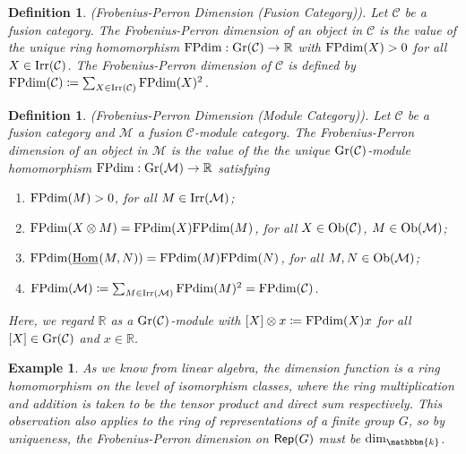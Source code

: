 \documentclass[12pt, reqno]{amsart}
\numberwithin{equation}{section}
\theoremstyle{plainspace}
\theoremstyle{definitionspace}
\newtheorem{definition}[theorem]{Definition}
\newtheorem{example}[theorem]{Example}
\theoremstyle{remarkspace}
\newcommand{\mathcat}[1]{\mathcal{#1}}
\newcommand{\Ob}{\textup{Ob}}
\newcommand{\IntHom}[2][]{
	\ifthenelse{\equal{#2}{}}
		{\underline{\textup{Hom}}_{#1}}
		{\underline{\textup{Hom}}_{#1}\!\left(#2\right)}
}
\newcommand{\textcat}[1]{\textup{\textsf{#1}}}
\newcommand{\Irr}{\textup{Irr}}
\newcommand{\Gr}{\textup{Gr}}
\newcommand{\FPdim}{\textup{FPdim}}
\begin{document}
\begin{definition}\label{def:frobenius-perron_dimension}{\em (Frobenius-Perron Dimension (Fusion Category)).} \cite[Section 8.1]{Etingof_2005}
Let $\mathcat{C}$ be a fusion category. The {\em Frobenius-Perron dimension} of an object in $\mathcat{C}$ is the value of the unique ring homomorphism $\FPdim : \Gr(\mathcat{C}) \to \mathbb{R}$ with $\FPdim(X) > 0$ for all $X \in \Irr(\mathcat{C})$. The Frobenius-Perron dimension of $\mathcat{C}$ is defined by $\FPdim(\mathcat{C}) \coloneqq \sum_{X \in \Irr(\mathcat{C})}{\FPdim(X)^2}$.
\end{definition}
\leavevmode

\begin{definition}\label{def:frobenius-perron_dimension_module}{\em (Frobenius-Perron Dimension (Module Category)).} \cite[Section 2.5]{Etingof_2010}
Let $\mathcat{C}$ be a fusion category and $\mathcat{M}$ a fusion $\mathcat{C}$-module category. The {\em Frobenius-Perron dimension} of an object in $\mathcat{M}$ is the value of the the unique $\Gr(\mathcat{C})$-module homomorphism $\FPdim : \Gr(\mathcat{M}) \to \mathbb{R}$ satisfying
\begin{enumerate}[start=1, leftmargin=1.5cm, label={(\arabic*).}]
\item $\FPdim(M) > 0$, for all $M \in \Irr(\mathcat{M})$;
\item $\FPdim(X \otimes M) = \FPdim(X)\FPdim(M)$, for all $X \in \Ob(\mathcat{C})$, $M \in \Ob(\mathcat{M})$;
\item $\FPdim(\IntHom{M, N}) = \FPdim(M)\FPdim(N)$, for all $M, N \in \Ob(\mathcat{M})$;
\item $\FPdim(\mathcat{M}) \coloneqq \sum_{M \in \Irr(\mathcat{M})}{\FPdim(M)^2} = \FPdim(\mathcat{C})$.
\end{enumerate}
\noindent Here, we regard $\mathbb{R}$ as a $\Gr(\mathcat{C})$-module with $[X] \otimes x \coloneqq \FPdim(X)x$ for all $[X] \in \Gr(\mathcat{C})$ and $x \in \mathbb{R}$.
\end{definition}
\leavevmode

\begin{example}\label{ex:frobenius-perron_dimension_rep}
As we know from linear algebra, the dimension function is a ring homomorphism on the level of isomorphism classes, where the ring multiplication and addition is taken to be the tensor product and direct sum respectively. This observation also applies to the ring of representations of a finite group $G$, so by uniqueness, the Frobenius-Perron dimension on $\textcat{Rep}(G)$ must be $\dim_{\mathbbm{k}}$.
\end{example}
\leavevmode
\end{document}
